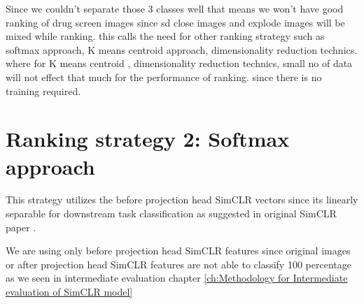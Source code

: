 Since we couldn't separate those 3 classes well that means we won't have good ranking of drug screen images since sd close images and explode images will be mixed while ranking. this calls the need for other ranking strategy such as softmax approach, K means centroid approach, dimensionality reduction technics. where for K means centroid , dimensionality reduction technics, small no of data will not effect that much for the performance of ranking. since there is no training required.

\section{Ranking strategy 2: Softmax approach}

This strategy utilizes the before projection head SimCLR vectors since its linearly separable for downstream task classification as suggested in original SimCLR paper \cite{chen2020simple}.

We are using only before projection head SimCLR features since original images or after projection head SimCLR features are not able to classify 100 percentage as we seen in intermediate evaluation chapter \ref{ch:Methodology for Intermediate evaluation of SimCLR model}

